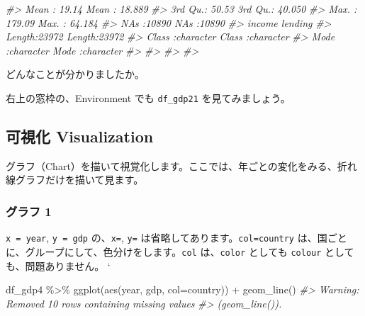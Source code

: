 \documentclass[
]{bxjsbook}
\newenvironment{Shaded}{\begin{snugshade}}{\end{snugshade}}
\newcommand{\AttributeTok}[1]{\textcolor[rgb]{0.77,0.63,0.00}{#1}}
\newcommand{\CommentTok}[1]{\textcolor[rgb]{0.56,0.35,0.01}{\textit{#1}}}
\newcommand{\FunctionTok}[1]{\textcolor[rgb]{0.00,0.00,0.00}{#1}}
\newcommand{\NormalTok}[1]{#1}
\newcommand{\SpecialCharTok}[1]{\textcolor[rgb]{0.00,0.00,0.00}{#1}}
\theoremstyle{definition}
\theoremstyle{definition}
\theoremstyle{definition}
\theoremstyle{definition}
\theoremstyle{remark}
\begin{document}
\begin{Shaded}
\begin{Highlighting}[]
\CommentTok{\#\textgreater{}                     Mean   :  19.14   Mean   : 18.889  }
\CommentTok{\#\textgreater{}                     3rd Qu.:  50.53   3rd Qu.: 40.050  }
\CommentTok{\#\textgreater{}                     Max.   : 179.09   Max.   : 64.184  }
\CommentTok{\#\textgreater{}                     NA\textquotesingle{}s   :10890     NA\textquotesingle{}s   :10890    }
\CommentTok{\#\textgreater{}     income            lending         }
\CommentTok{\#\textgreater{}  Length:23972       Length:23972      }
\CommentTok{\#\textgreater{}  Class :character   Class :character  }
\CommentTok{\#\textgreater{}  Mode  :character   Mode  :character  }
\CommentTok{\#\textgreater{}                                       }
\CommentTok{\#\textgreater{}                                       }
\CommentTok{\#\textgreater{}                                       }
\CommentTok{\#\textgreater{} }
\end{Highlighting}
\end{Shaded}

どんなことが分かりましたか。

右上の窓枠の、Environment でも \texttt{df\_gdp21} を見てみましょう。

\hypertarget{ux53efux8996ux5316-visualization}{%
\subsection{可視化 Visualization}\label{ux53efux8996ux5316-visualization}}

グラフ（Chart）を描いて視覚化します。ここでは、年ごとの変化をみる、折れ線グラフだけを描いて見ます。

\hypertarget{ux30b0ux30e9ux30d5-1}{%
\subsubsection{グラフ 1}\label{ux30b0ux30e9ux30d5-1}}

\texttt{x\ =\ year}, \texttt{y\ =\ gdp} の、\texttt{x=}, \texttt{y=} は省略してあります。\texttt{col=country} は、国ごとに、グループにして、色分けをします。\texttt{col} は、\texttt{color} としても \texttt{colour} としても、問題ありません。
`

\begin{Shaded}
\begin{Highlighting}[]
\NormalTok{df\_gdp4 }\SpecialCharTok{\%\textgreater{}\%} \FunctionTok{ggplot}\NormalTok{(}\FunctionTok{aes}\NormalTok{(year, gdp, }\AttributeTok{col=}\NormalTok{country)) }\SpecialCharTok{+} \FunctionTok{geom\_line}\NormalTok{()}
\CommentTok{\#\textgreater{} Warning: Removed 10 rows containing missing values}
\CommentTok{\#\textgreater{} (\textasciigrave{}geom\_line()\textasciigrave{}).}
\end{Highlighting}
\end{Shaded}
\end{document}
